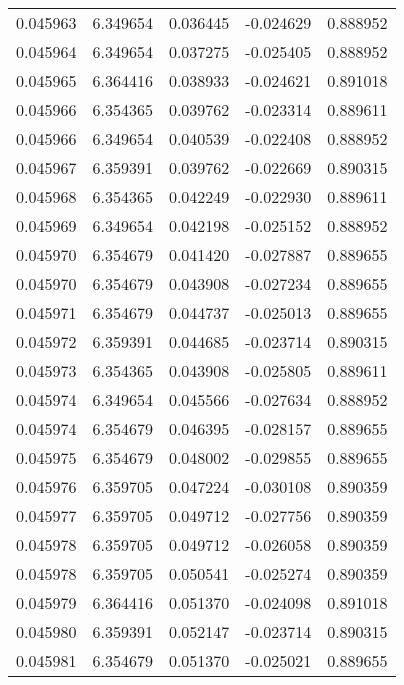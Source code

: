 \begin{tabular}{lrrrr}
0.045963    &  6.349654 &  0.036445 & -0.024629 &             0.888952 \\
0.045964    &  6.349654 &  0.037275 & -0.025405 &             0.888952 \\
0.045965    &  6.364416 &  0.038933 & -0.024621 &             0.891018 \\
0.045966    &  6.354365 &  0.039762 & -0.023314 &             0.889611 \\
0.045966    &  6.349654 &  0.040539 & -0.022408 &             0.888952 \\
0.045967    &  6.359391 &  0.039762 & -0.022669 &             0.890315 \\
0.045968    &  6.354365 &  0.042249 & -0.022930 &             0.889611 \\
0.045969    &  6.349654 &  0.042198 & -0.025152 &             0.888952 \\
0.045970    &  6.354679 &  0.041420 & -0.027887 &             0.889655 \\
0.045970    &  6.354679 &  0.043908 & -0.027234 &             0.889655 \\
0.045971    &  6.354679 &  0.044737 & -0.025013 &             0.889655 \\
0.045972    &  6.359391 &  0.044685 & -0.023714 &             0.890315 \\
0.045973    &  6.354365 &  0.043908 & -0.025805 &             0.889611 \\
0.045974    &  6.349654 &  0.045566 & -0.027634 &             0.888952 \\
0.045974    &  6.354679 &  0.046395 & -0.028157 &             0.889655 \\
0.045975    &  6.354679 &  0.048002 & -0.029855 &             0.889655 \\
0.045976    &  6.359705 &  0.047224 & -0.030108 &             0.890359 \\
0.045977    &  6.359705 &  0.049712 & -0.027756 &             0.890359 \\
0.045978    &  6.359705 &  0.049712 & -0.026058 &             0.890359 \\
0.045978    &  6.359705 &  0.050541 & -0.025274 &             0.890359 \\
0.045979    &  6.364416 &  0.051370 & -0.024098 &             0.891018 \\
0.045980    &  6.359391 &  0.052147 & -0.023714 &             0.890315 \\
0.045981    &  6.354679 &  0.051370 & -0.025021 &             0.889655 \\

\end{tabular}
